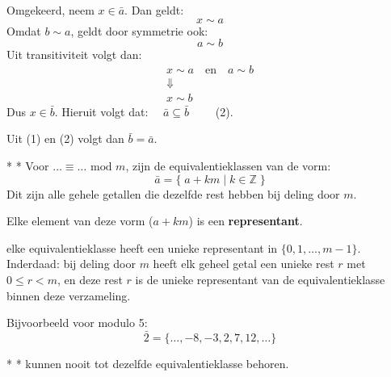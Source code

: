 Omgekeerd, neem $x \in \bar{a}$. Dan geldt:
\begin{equation*}
    x \sim a
\end{equation*}
Omdat $b \sim a$, geldt door symmetrie ook:
\begin{equation*}
    a \sim b
\end{equation*}
Uit transitiviteit volgt dan:
\begin{equation*}
    \begin{gathered}
        x \sim a \quad \text{en} \quad a \sim b \\
        \Downarrow \\
        x \sim b
    \end{gathered}
\end{equation*}
Dus $x \in \bar{b}$. Hieruit volgt dat: $\quad \bar{a} \subseteq \bar{b} \qquad$ (2).

Uit (1) en (2) volgt dan $\bar{b} = \bar{a}$.

\begin{niceexample}*
    \nextpart[]*
    Voor $\ldots \equiv \dots \text{ mod } m$, zijn de equivalentieklassen van de vorm:
    \begin{equation*}
        \bar{a} = \{\;a + km \mid k \in \mathbb{Z}\;\}
    \end{equation*}
    Dit zijn alle gehele getallen die dezelfde rest hebben bij deling door $m$.

    \vspace{0.25cm}

    Elke element van deze vorm ($a+km$) is een \textcolor{orange!75!black}{\textbf{representant}}.

    \vspace{0.25cm}

    \textcolor{orange!75!black}{\textbf{}} elke equivalentieklasse heeft een unieke representant in $\{0,1,\dots,m-1\}$. Inderdaad: bij deling door $m$ heeft elk geheel getal een unieke rest $r$ met $0 \le r < m$, en deze rest $r$ is de unieke representant van de equivalentieklasse binnen deze verzameling.

    \vspace{0.25cm}

    Bijvoorbeeld voor modulo 5:
    \begin{equation*}
        \bar{2} = \{\dots, -8, -3, 2, 7, 12, \dots\}
    \end{equation*}
\end{niceexample}

\begin{niceproperty}*
    \nextpart[Representanten]*
    kunnen nooit tot dezelfde equivalentieklasse behoren.
\end{niceproperty}

